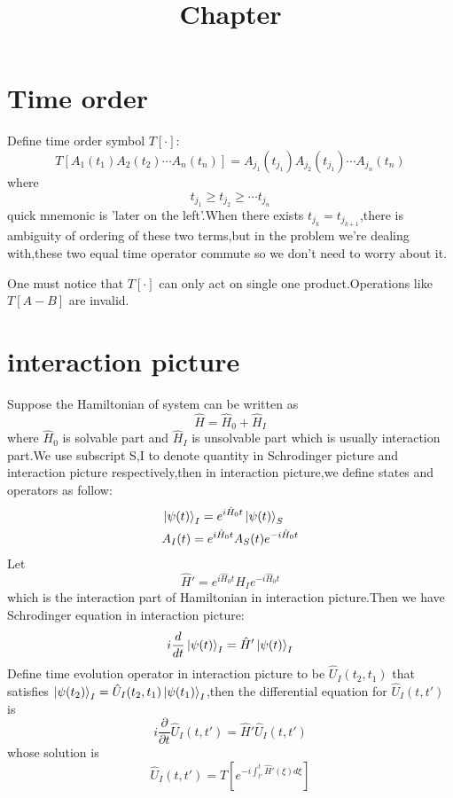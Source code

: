 \documentclass[a4paper]{article}
\begin{document}
	\title{Chapter}
	\date{ }
	\maketitle
\section{Time order}
Define time order symbol $T[\cdot]$:$$T[A_1(t_1)A_2(t_2)\cdots A_n(t_n)]=A_{j_1}(t_{j_1})A_{j_2}(t_{j_1})\cdots A_{j_n}(t_n)$$
where $$t_{j_1}\geq t_{j_2}\geq\cdots t_{j_n}$$quick mnemonic is 'later on the left'.When there exists $t_{j_k}=t_{j_{k+1}}$,there is ambiguity of ordering of these two terms,but in the problem we're dealing with,these two equal time operator commute so we don't need to worry about it.
\par One must notice that $T[\cdot]$ can only act on single one product.Operations like $T[A-B]$ are invalid.
\section{interaction picture}
Suppose the Hamiltonian of system can be written as$$\hat{H}=\hat{H}_0+\hat{H}_I$$where $\hat{H}_0$ is solvable part and $\hat{H}_I$ is unsolvable part which is usually interaction part.We use subscript S,I to denote quantity in Schrodinger picture and interaction picture respectively,then in interaction picture,we define states and operators as follow:
\begin{align*}
	&\ket{\psi(t)}_I=e^{i\hat{H}_0t}\ket{\psi(t)}_S\\
	&A_I(t)=e^{i\hat{H}_0t}A_S(t)e^{-i\hat{H}_0t}
\end{align*}
Let$$\hat{H}'=e^{i\hat{H}_0t}H_Ie^{-i\hat{H}_0t}$$
which is the interaction part of Hamiltonian in interaction picture.Then we have Schrodinger equation in interaction picture:$$i\frac{d}{dt}\ket{\psi(t)}_I=\hat{H}'\ket{\psi(t)}_I$$
Define time evolution operator in interaction picture to be $\hat{U}_I(t_2,t_1)$ that satisfies $\ket{\psi(t_2)}_I=\hat{U}_I(t_2,t_1)\ket{\psi(t_1)}_I$,then the differential equation for $\hat{U}_I(t,t')$ is$$i\frac{\partial}{\partial t}\hat{U}_I(t,t')=\hat{H}'\hat{U}_I(t,t')$$whose solution is$$\hat{U}_I(t,t')=T[e^{-i\int_{t'}^{t}\hat{H}'(\xi)d\xi}]$$
\end{document}

